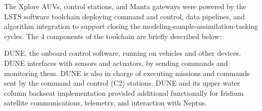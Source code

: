 



The Xplore AUVs, control stations, and Manta gateways were powered by
the LSTS software toolchain \cite{pinto2013lsts} deploying command and
control, data pipelines, and algorithm integration to support closing
the modeling-sample-assimilation-tasking cycles. The 4 components of the
toolchain are briefly described below:

DUNE, the onboard control software, running on vehicles and other
devices. DUNE interfaces with sensors and actuators, by sending commands
and monitoring them. DUNE is also in charge of executing missions and
commands sent by the command and control (C2) stations. DUNE and its
upper water column backseat implementation provided additional
functionally for Iridium satellite communications, telemetry, and
interaction with Neptus.

